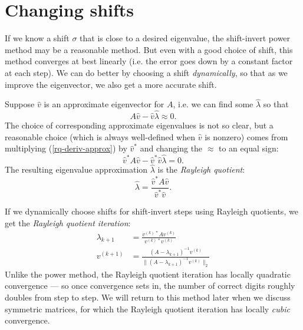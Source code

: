 \section{Changing shifts}

If we know a shift $\sigma$ that is close to a desired eigenvalue,
the shift-invert power method may be a reasonable method.  But even
with a good choice of shift, this method converges at best linearly
(i.e. the error goes down by a constant factor at each step).
We can do better by choosing a shift {\em dynamically}, so that as
we improve the eigenvector, we also get a more accurate shift.

Suppose $\hat{v}$ is an approximate eigenvector for $A$, i.e.
we can find some $\hat{\lambda}$ so that
\begin{equation} \label{rq-deriv-approx}
  A \hat{v} - \hat{v} \hat{\lambda} \approx 0.
\end{equation}
The choice of corresponding approximate eigenvalues is not so clear,
but a reasonable choice (which is always well-defined when $\hat{v}$
is nonzero) comes from multiplying (\ref{rq-deriv-approx}) by $\hat{v}^*$
and changing the $\approx$ to an equal sign:
\[
  \hat{v}^* A \hat{v} - \hat{v}^* \hat{v} \hat{\lambda} = 0.
\]
The resulting eigenvalue approximation $\hat{\lambda}$ is
the {\em Rayleigh quotient}:
\[
  \hat{\lambda} = \frac{ \hat{v}^* A \hat{v} }{ \hat{v}^* \hat{v} }.
\]

If we dynamically choose shifts for shift-invert steps using
Rayleigh quotients, we get the {\em Rayleigh quotient iteration}:
\begin{align*}
  \lambda_{k+1} &= \frac{v^{(k)\,*} A v^{(k)}}{v^{(k)\,*} v^{(k)}} \\
  v^{(k+1)} &=
    \frac{ (A-\lambda_{k+1})^{-1} v^{(k)} }
         {\| (A-\lambda_{k+1})^{-1} v^{(k)} \|_2}
\end{align*}
Unlike the power method, the Rayleigh quotient iteration has locally
quadratic convergence --- so once convergence sets in, the number of
correct digits roughly doubles from step to step.  We will return to
this method later when we discuss symmetric matrices, for which
the Rayleigh quotient iteration has locally {\em cubic} convergence.
